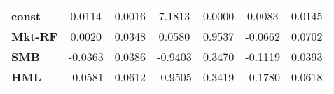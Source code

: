 \begin{center}
\begin{tabular}{lcccccc}
\midrule
\textbf{const}  &       0.0114       &       0.0016       &      7.1813     &      0.0000      &       0.0083      &       0.0145       \\
\textbf{Mkt-RF} &       0.0020       &       0.0348       &      0.0580     &      0.9537      &      -0.0662      &       0.0702       \\
\textbf{SMB}    &      -0.0363       &       0.0386       &     -0.9403     &      0.3470      &      -0.1119      &       0.0393       \\
\textbf{HML}    &      -0.0581       &       0.0612       &     -0.9505     &      0.3419      &      -0.1780      &       0.0618       \\
\bottomrule
\end{tabular}
\end{center}
